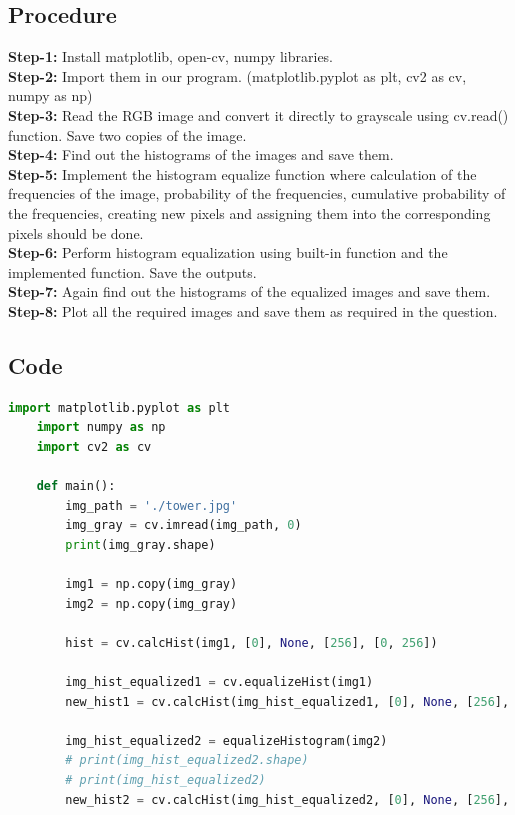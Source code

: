 \documentclass{article}
\begin{document}
{    \subsection{Procedure}
    \textbf{Step-1:}
    Install matplotlib, open-cv, numpy libraries.\\
    \textbf{Step-2:}
    Import them in our program. (matplotlib.pyplot as plt, cv2 as cv, numpy as np)\\
    \textbf{Step-3:}
    Read the RGB image and convert it directly to grayscale using cv.read() function. Save two copies of the image.\\
    \textbf{Step-4:}
    Find out the histograms of the images and save them.\\
    \textbf{Step-5:}
    Implement the histogram equalize function where calculation of the frequencies of the image, probability of the frequencies, cumulative probability of the frequencies, creating new pixels and assigning them into the corresponding pixels should be done.\\
    \textbf{Step-6:}
    Perform histogram equalization using built-in function and the implemented function. Save the outputs.\\
    \textbf{Step-7:}
    Again find out the histograms of the equalized images and save them.\\
    \textbf{Step-8:}
    Plot all the required images and save them as required in the question.\\
    
    \subsection{Code}
    \lstset{style=mystyle}
    \begin{lstlisting}[language=Python, caption=Code for histogram equalization]
    import matplotlib.pyplot as plt
    import numpy as np
    import cv2 as cv
    
    def main():
        img_path = './tower.jpg'
        img_gray = cv.imread(img_path, 0)
        print(img_gray.shape)
    
        img1 = np.copy(img_gray)
        img2 = np.copy(img_gray)
    
        hist = cv.calcHist(img1, [0], None, [256], [0, 256])
        
        img_hist_equalized1 = cv.equalizeHist(img1)
        new_hist1 = cv.calcHist(img_hist_equalized1, [0], None, [256], [0, 256]) 
    
        img_hist_equalized2 = equalizeHistogram(img2)
        # print(img_hist_equalized2.shape)
        # print(img_hist_equalized2)
        new_hist2 = cv.calcHist(img_hist_equalized2, [0], None, [256], [0, 256])
    

\end{lstlisting}}
\end{document}
